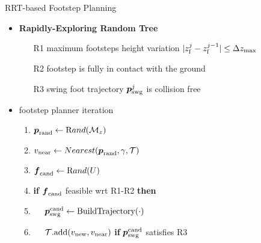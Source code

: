 \documentclass[10pt]{beamer}
\begin{document}
\begin{frame}{RRT-based Footstep Planning}
  \begin{itemize}
    \item \textbf{Rapidly-Exploring Random Tree}
      \begin{itemize}[<alert@+>]
        \item[R1] maximum footsteps height variation
				    $|z_{\rm f}^j - z_{\rm f}^{j-1}| \le \Delta z_{\max}$
        \item[R2] footstep is fully in contact with the ground
        \item[R3] swing foot trajectory ${\mbox{\boldmath $p$}}_{\rm {swg}}^j$ is collision free
			\end{itemize}
    \item footstep planner iteration
      \begin{enumerate}[<alert@+>]
        \item ${\mbox{\boldmath $p$}}_{\rm rand} \leftarrow {\text Rand}(\mathcal{M}_z)$
				\item $v_{\rm near} \leftarrow Nearest({\mbox{\boldmath $p$}}_{\rm rand}, \gamma,
            \mathcal{T})$
        \item ${\mbox{\boldmath $f$}}_{\rm cand} \leftarrow {\text Rand}(U)$
				\item \textbf{if} ${\mbox{\boldmath $f$}}_{\rm cand}$ feasible wrt R1-R2 \textbf{then}
				\item $\quad$ ${\mbox{\boldmath $p$}}_{\rm swg}^{\rm cand}
						\leftarrow \text{BuildTrajectory}(\cdot)$
				\item $\quad$ $\mathcal{T}\text{.add}(v_{\rm new}, v_{\rm near})$
						\textbf{if} ${\mbox{\boldmath $p$}}_{\rm swg}^{\rm cand}$ satisfies R3
      \end{enumerate}
	\end{itemize}
\end{frame}
\end{document}
